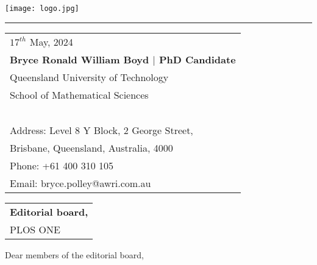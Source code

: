 \documentclass{article}
\begin{document}

\texttt{[image: logo.jpg]} %

\vspace{-1em} %

\rule{\linewidth}{1pt} %

\bigskip\bigskip %


\hfill
\begin{tabular}{l @{}}
	$17^{th}$ May, 2024\\ %
	\textbf{Bryce Ronald William Boyd $|$ PhD Candidate}\\
	Queensland University of Technology \\
	School of Mathematical Sciences\\~\\
	Address: Level 8 Y Block, 2 George Street, \\
	Brisbane, Queensland, Australia, 4000\\
	Phone: +61 400 310 105 \\
	Email: bryce.polley@awri.com.au
\end{tabular}

\bigskip %


\begin{tabular}{@{} l}
	\textbf{Editorial board,}\\
	PLOS ONE\\
\end{tabular}

\bigskip %

Dear members of the editorial board,
\\~\\
\parskip %
\end{document}
